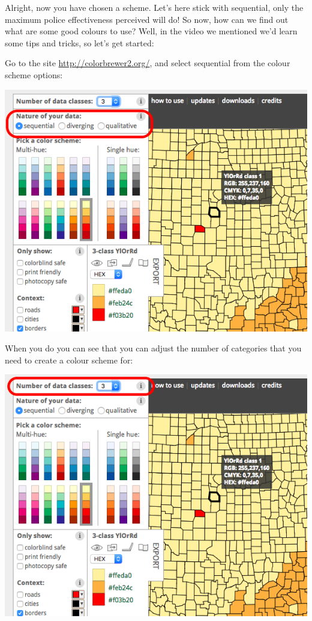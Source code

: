 \documentclass[
]{book}
\begin{document}
Alright, now you have chosen a scheme. Let's here stick with sequential, only the maximum police effectiveness perceived will do! So now, how can we find out what are some good colours to use? Well, in the video we mentioned we'd learn some tips and tricks, so let's get started:

Go to the site \url{http://colorbrewer2.org/}, and select sequential from the colour scheme options:

\includegraphics{imgs/choose_col_vartyp.png}

When you do you can see that you can adjust the number of categories that you need to create a colour scheme for:

\includegraphics{imgs/choose_col_num.png}
\end{document}
